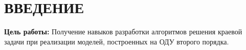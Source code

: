 \chapter*{\hfill{}ВВЕДЕНИЕ\hfill}

\textbf{Цель работы:} Получение навыков разработки алгоритмов решения краевой задачи при реализации моделей, построенных на ОДУ второго порядка.

